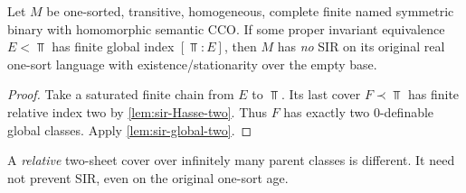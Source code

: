 \begin{theorem}
\label{thm:sir-finite-global-no}
Let \(M\) be one-sorted, transitive,
homogeneous, complete finite named
symmetric binary with homomorphic semantic
CCO. If some proper invariant equivalence
\(E<\Top\) has finite global index
\([\Top:E]\), then \(M\) has \emph{no}
SIR on its original real one-sort language
with existence/stationarity over
the empty base.
\end{theorem}
\begin{proof}
Take a saturated finite chain from
\(E\) to \(\Top\). Its last cover
\(F\prec\Top\) has finite relative
index two by
\cref{lem:sir-Hasse-two}.
Thus \(F\) has exactly two
\(0\)-definable global classes.
Apply \cref{lem:sir-global-two}.
\end{proof}

A \emph{relative} two-sheet cover over
infinitely many parent classes is
different. It need not prevent SIR,
even on the original one-sort age.

